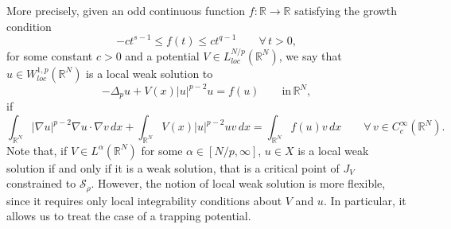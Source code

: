 \documentclass[11pt,reqno]{amsart}
\theoremstyle{definition}
\numberwithin{equation}{section}
\numberwithin{theorem}{section}
\numberwithin{equation}{section}
\numberwithin{theorem}{section}
\newcommand{\R}{\mathbb{R}}
\begin{document}
More precisely, given an odd continuous function $f:\R\to\R$ satisfying the growth condition 
\begin{equation}\label{growth-f-qs}
-ct^{s-1}\le f(t)\le ct^{q-1}\qquad\forall\, t>0, 
\end{equation}
for some constant $c>0$ and a potential $V\in L^{N/p}_{loc}(\R^N)$, we say that $u\in W^{1,p}_{loc}(\R^N)$ %
is a \color{red}local \color{black}weak solution to 
\begin{equation}\label{eq-pohozaev-intr}
-\Delta_p u+V(x)|u|^{p-2}u=f(u)\qquad\text{in}\,\R^N,
\end{equation}
if
\begin{equation}
\int_{\R^N}|\nabla u|^{p-2}\nabla u\cdotp\nabla v\,dx+\int_{\R^N} V(x)|u|^{p-2}uv\, dx=\int_{\R^N}f(u)v \, dx\qquad\forall\, v\in C^\infty_c(\R^N). 
\end{equation}
Note that, if $V\in L^\alpha(\R^N)$ for some $\alpha\in[N/p,\infty]$, $u\in X$ is a local weak solution if and only if it is a weak solution, that is a critical point of $J_{V}$ constrained to $\mathcal{S}_\rho$. However, the notion of local weak solution is more flexible, since it requires only local integrability conditions about $V$ and $u$. In particular, it allows us to treat the case of a trapping potential.\\
\end{document}
